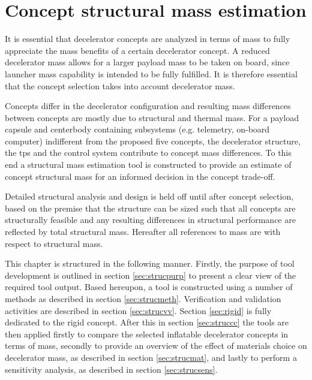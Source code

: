 \section{Concept structural mass estimation} \label{ch:strucmass}
It is essential that decelerator concepts are analyzed in terms of mass to fully appreciate the mass benefits of a certain decelerator concept. A reduced decelerator mass allows for a larger payload mass to be taken on board, since launcher mass capability is intended to be fully fulfilled. It is therefore essential that the concept selection takes into account decelerator mass. 

Concepts differ in the decelerator configuration and resulting mass differences between concepts are mostly due to structural and thermal mass. For a payload capsule and centerbody containing subsystems (e.g. telemetry, on-board computer) indifferent from the proposed five concepts, the decelerator structure, the \acrfull{tps} and the control system contribute to concept mass differences. To this end a structural mass estimation tool is constructed to provide an estimate of concept structural mass for an informed decision in the concept trade-off. 

Detailed structural analysis and design is held off until after concept selection, based on the premise that the structure can be sized such that all concepts are structurally feasible and any resulting differences in structural performance are reflected by total structural mass. Hereafter all references to mass are with respect to structural mass.

This chapter is structured in the following manner. Firstly, the purpose of tool development is outlined in section \ref{sec:strucpurp} to present a clear view of the required tool output. Based hereupon, a tool is constructed using a number of methods as described in section \ref{sec:strucmeth}. Verification and validation activities are described in section \ref{sec:strucvv}. Section \ref{sec:rigid} is fully dedicated to the rigid concept. After this in section \ref{sec:struccc} the tools are then applied firstly to compare the selected inflatable decelerator concepts in terms of mass, secondly to provide an overview of the effect of materials choice on decelerator mass, as described in section \ref{sec:strucmat}, and lastly to perform a sensitivity analysis, as described in section \ref{sec:strucsens}.


